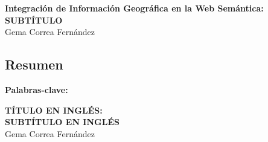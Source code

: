 \chapter*{}
\thispagestyle{empty}






\cleardoublepage
\thispagestyle{empty}

\begin{center} 
	\large{\textbf{Integración de Información Geográfica en la Web Semántica:\\ SUBTÍTULO}}\\
	\vspace{0.25in}
	Gema Correa Fernández
\end{center}


\section*{Resumen}


\vspace{0.25in}

{\bf Palabras-clave:} 

\cleardoublepage


\thispagestyle{empty}


\begin{center} 
	\large{\textbf{TÍTULO EN INGLÉS:\\ SUBTÍTULO EN INGLÉS}}\\
	\vspace{0.25in}
	Gema Correa Fernández
\end{center}

